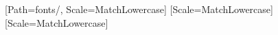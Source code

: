 \ifPDFTeX
  \newcommand{\fg}[1]{\begin{CJK}{UTF8}{gbsn}\fontencoding{T2A}\selectfont#1\end{CJK}}
\else
  \newfontfamily{}[Path=fonts/, Scale=MatchLowercase]
  \newcommand{\fg}[1]{{\intlfont #1}}
    {\newfontfamily{}[Scale=MatchLowercase]}{\let\devfont\intlfont}
    {\newfontfamily{}[Scale=MatchLowercase]}{\let\geofont\intlfont}
  \newcommand{\fgd}[1]{{\devfont #1}}
  \newcommand{\fgg}[1]{{\geofont #1}}
\fi
\ifPDFTeX \newcommand{\fgd}[1]{#1}\newcommand{\fgg}[1]{#1}\fi
